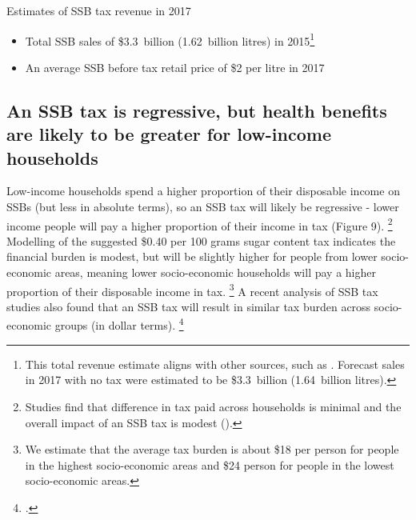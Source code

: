 \documentclass[embargoed]{grattan}
\begin{document}
\begin{table}
\caption{Estimates of SSB tax revenue in 2017}




\end{table}

\begin{itemize}
\item
  Total SSB sales of \$3.3~billion (1.62~billion litres) in 2015\footnote{This total revenue estimate aligns with other sources, such as \textcite{Levy2014QuenchingAustraliasthirst}.
Forecast sales in 2017 with no tax were estimated to be \$3.3~billion (1.64~billion litres).}
\item
  An average SSB before tax retail price of \$2 per litre in 2017
\end{itemize}

\subsection{An SSB tax is regressive, but health benefits are likely to be greater for low-income households}\label{an-ssb-tax-is-regressive-but-health-benefits-are-likely-to-be-greater-for-low-income-households}

Low-income households spend a higher proportion of their disposable income on SSBs (but less in absolute terms), so an SSB tax will likely be regressive - lower income people will pay a higher proportion of their income in tax (Figure 9).%
\footnote{Studies find that difference in tax paid across households is minimal and the overall impact of an SSB tax is modest (\textcites{Backholer2014effectsugarsweetened}{Etile2015DoHighConsumers}).} Modelling of the suggested \$0.40 per 100 grams sugar content tax indicates the financial burden is modest, but will be slightly higher for people from lower socio-economic areas, meaning lower socio-economic households will pay a higher proportion of their disposable income in tax.%
\footnote{We estimate that the average tax burden is about \$18 per person for people in the highest socio-economic areas and \$24 person for people in the lowest socio-economic areas.} A recent analysis of SSB tax studies also found that an SSB tax will result in similar tax burden across socio-economic groups (in dollar terms).%
\footcite{Backholer2016impacttaxsugar}
\end{document}
